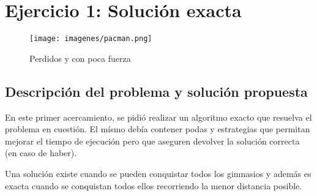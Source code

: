 \section{Ejercicio 1: Solución exacta}

  \begin{figure}[ht]
    \begin{center}
      \texttt{[image: imagenes/pacman.png]}
      \caption{Perdidos y con poca fuerza}
    \end{center}
  \end{figure}

    \subsection{Descripción del problema y solución propuesta}
        En este primer acercamiento, se pidió realizar un algoritmo exacto que resuelva el problema en cuestión. El mísmo debía contener podas y estrategias que permitan mejorar el tiempo de ejecución pero que aseguren devolver la solución correcta (en caso de haber).

        Una solución existe cuando se pueden conquistar todos los gimnasios y además es exacta cuando se conquistan todos ellos recorriendo la menor distancia posible.

